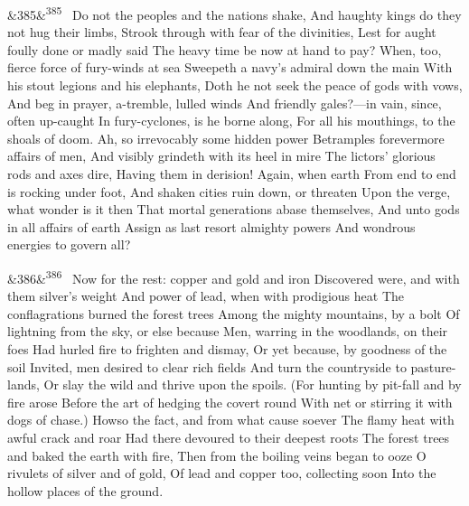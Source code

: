 \documentclass[12pt]{article}
\newcommand{\para}[1][]{\par\noindent\ifx&#1&\else\textsuperscript{\footnotesize #1}~\fi}
\begin{document}
\para[385] Do not the peoples and the nations shake, And haughty kings do they not hug their limbs, Strook through with fear of the divinities, Lest for aught foully done or madly said The heavy time be now at hand to pay? When, too, fierce force of fury-winds at sea Sweepeth a navy's admiral down the main With his stout legions and his elephants, Doth he not seek the peace of gods with vows, And beg in prayer, a-tremble, lulled winds And friendly gales?---in vain, since, often up-caught In fury-cyclones, is he borne along, For all his mouthings, to the shoals of doom. Ah, so irrevocably some hidden power Betramples forevermore affairs of men, And visibly grindeth with its heel in mire The lictors' glorious rods and axes dire, Having them in derision! Again, when earth From end to end is rocking under foot, And shaken cities ruin down, or threaten Upon the verge, what wonder is it then That mortal generations abase themselves, And unto gods in all affairs of earth Assign as last resort almighty powers And wondrous energies to govern all?

\para[386] Now for the rest: copper and gold and iron Discovered were, and with them silver's weight And power of lead, when with prodigious heat The conflagrations burned the forest trees Among the mighty mountains, by a bolt Of lightning from the sky, or else because Men, warring in the woodlands, on their foes Had hurled fire to frighten and dismay, Or yet because, by goodness of the soil Invited, men desired to clear rich fields And turn the countryside to pasture-lands, Or slay the wild and thrive upon the spoils. (For hunting by pit-fall and by fire arose Before the art of hedging the covert round With net or stirring it with dogs of chase.) Howso the fact, and from what cause soever The flamy heat with awful crack and roar Had there devoured to their deepest roots The forest trees and baked the earth with fire, Then from the boiling veins began to ooze O rivulets of silver and of gold, Of lead and copper too, collecting soon Into the hollow places of the ground.
\end{document}
